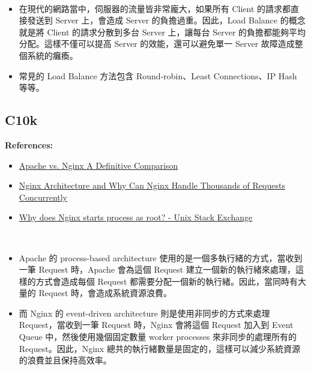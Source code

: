 \documentclass[12pt]{article}
\newenvironment{problem}[2][Problem]{\begin{trivlist}
\item[\hskip \labelsep {\bfseries #1}\hskip \labelsep {\bfseries #2}]}{\end{trivlist}}
\newenvironment{mycolorbox}[1][gray]{
  \renewmdenv[
    linewidth=2pt, linecolor=#1, backgroundcolor=#1!10,
    topline=false, bottomline=false, rightline=false,
    skipabove=10pt, skipbelow=10pt, innerleftmargin=10pt,
    innerrightmargin=0pt, innertopmargin=5pt, innerbottommargin=5pt
  ]{myquote}
  \begin{myquote}
}{\end{myquote}}
\begin{document}
\begin{problem}{1.1 (c)} 　
  \begin{itemize}
  \item 在現代的網路當中，伺服器的流量皆非常龐大，如果所有 Client 的請求都直接發送到 Server 上，會造成 Server 的負擔過重。因此，Load Balance 的概念就是將 Client 的請求分散到多台 Server 上，讓每台 Server 的負擔都能夠平均分配。這樣不僅可以提高 Server 的效能，還可以避免單一 Server 故障造成整個系統的癱瘓。
  \item 常見的 Load Balance 方法包含 Round-robin、Least Connections、IP Hash 等等。
  \end{itemize}
\end{problem}

\subsection{C10k}
\begin{mycolorbox}[teal]
  \textbf{References:}  
  \footnotesize
  \begin{itemize}
    \item \href{https://www.site24x7.com/learn/web-server/apache-vs-nginx-web-server.html}{Apache vs. Nginx A Definitive Comparison}
    \item \href{https://medium.com/@caophuc799/nginx-architecture-and-why-can-nginx-handle-thousands-of-requests-concurrently-b8686b558f86}{Nginx Architecture and Why Can Nginx Handle Thousands of Requests Concurrently}
    \item \href{https://unix.stackexchange.com/questions/134301/why-does-nginx-starts-process-as-root}{Why does Nginx starts process as root? - Unix Stack Exchange}
  \end{itemize}
\end{mycolorbox}

\begin{problem}{1.2 (a)} 　
  \begin{itemize}
    \item Apache 的 process-based architecture 使用的是一個多執行緒的方式，當收到一筆 Request 時，Apache 會為這個 Request 建立一個新的執行緒來處理，這樣的方式會造成每個 Request 都需要分配一個新的執行緒。因此，當同時有大量的 Request 時，會造成系統資源浪費。
    \item 而 Nginx 的 event-driven architecture 則是使用非同步的方式來處理 Request，當收到一筆 Request 時，Nginx 會將這個 Request 加入到 Event Queue 中，然後使用幾個固定數量 worker processes 來非同步的處理所有的 Request。因此，Nginx 總共的執行緒數量是固定的，這樣可以減少系統資源的浪費並且保持高效率。
  \end{itemize}
\end{problem}
\end{document}
